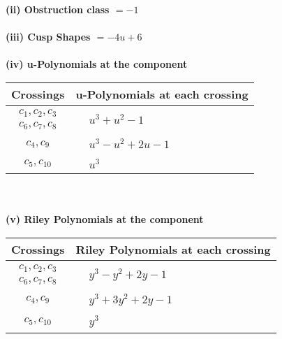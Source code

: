 \documentclass[1p]{elsarticle_modified}
\theoremstyle{definition}
\begin{document}
\flushleft \textbf{(ii) Obstruction class $= -1$}\\~\\
\flushleft \textbf{(iii) Cusp Shapes $= -4 u+6$}\\~\\
\newpage\renewcommand{\arraystretch}{1}
\flushleft \textbf{(iv) u-Polynomials at the component}\newline \\
\begin{tabular}{m{50pt}|m{274pt}}
Crossings & \hspace{64pt}u-Polynomials at each crossing \\
\hline $$\begin{aligned}c_{1},c_{2},c_{3}\\c_{6},c_{7},c_{8}\end{aligned}$$&$\begin{aligned}
&u^3+u^2-1
\end{aligned}$\\
\hline $$\begin{aligned}c_{4},c_{9}\end{aligned}$$&$\begin{aligned}
&u^3- u^2+2 u-1
\end{aligned}$\\
\hline $$\begin{aligned}c_{5},c_{10}\end{aligned}$$&$\begin{aligned}
&u^3
\end{aligned}$\\
\hline
\end{tabular}\\~\\
\newpage\renewcommand{\arraystretch}{1}
\flushleft \textbf{(v) Riley Polynomials at the component}\newline \\
\begin{tabular}{m{50pt}|m{274pt}}
Crossings & \hspace{64pt}Riley Polynomials at each crossing \\
\hline $$\begin{aligned}c_{1},c_{2},c_{3}\\c_{6},c_{7},c_{8}\end{aligned}$$&$\begin{aligned}
&y^3- y^2+2 y-1
\end{aligned}$\\
\hline $$\begin{aligned}c_{4},c_{9}\end{aligned}$$&$\begin{aligned}
&y^3+3 y^2+2 y-1
\end{aligned}$\\
\hline $$\begin{aligned}c_{5},c_{10}\end{aligned}$$&$\begin{aligned}
&y^3
\end{aligned}$\\
\hline
\end{tabular}\\~\\
\end{document}

